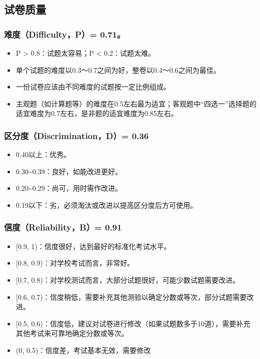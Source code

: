 \documentclass[hyperref,adobefonts]{ctexart}
\providecommand{\tightlist}{\setlength{\itemsep}{0pt}\setlength{\parskip}{0pt}}
\begin{document}
\subsection{试卷质量}

\subsubsection{难度（Difficulty，P）= 0.71。}\label{difficultyp-0.71}

\begin{itemize}
\tightlist
\item
  P \textgreater{} 0.8：试题太容易；P \textless{} 0.2：试题太难。
\item
  单个试题的难度以0.3～0.7之间为好，整卷以0.4～0.6之间为最佳。
\item
  一份试卷应该由不同难度的试题按一定比例组成。
\item
  主观题（如计算题等）的难度在0.5左右最为适宜；客观题中``四选一''选择题的适宜难度为0.7左右，是非题的适宜难度为0.85左右。
\end{itemize}

\subsubsection{区分度（Discrimination，D）=
0.36}\label{discriminationd-0.36}

\begin{itemize}
\tightlist
\item
  0.40以上：优秀。
\item
  0.30\textasciitilde{}0.39：良好，如能改进更好。
\item
  0.20\textasciitilde{}0.29：尚可，用时需作改进。
\item
  0.19以下：劣，必须淘汰或改进以提高区分度后方可使用。
\end{itemize}

\subsubsection{信度（Reliability，B）= 0.91}\label{reliabilityb-0.91}

\begin{itemize}
\tightlist
\item
  {[}0.9, 1)：信度很好，达到最好的标准化考试水平。
\item
  {[}0.8, 0.9)：对学校考试而言，非常好。
\item
  {[}0.7, 0.8)：对学校测试而言，大部分试题很好，可能少数试题需要改进。
\item
  {[}0.6,
  0.7)：信度稍低，需要补充其他测验以确定分数或等次，部分试题需要改进。
\item
  {[}0.5,
  0.6)：信度低，建议对试卷进行修改（如果试题数多于10道），需要补充其他考试来可靠地确定分数或等次。
\item
  (0, 0.5)：信度差，考试基本无效，需要修改
\end{itemize}
\end{document}
